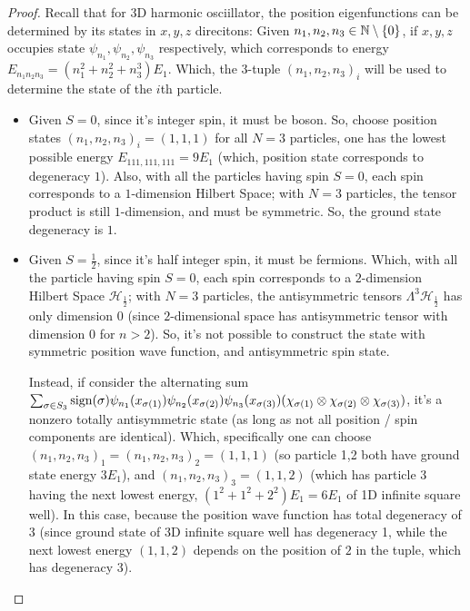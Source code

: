 \documentclass{article}
\begin{document}
\begin{proof}
    Recall that for 3D harmonic osciillator, the position eigenfunctions can be determined by its states in $x,y,z$ direcitons: Given $n_1,n_2,n_3\in\mathbb{N}\setminus\{0\}$, if $x,y,z$ occupies state $\psi_{n_1},\psi_{n_2},\psi_{n_3}$ respectively, which corresponds to energy $E_{n_1n_2n_3}=(n_1^2+n_2^2+n_3^3)E_1$. Which, the 3-tuple $(n_1,n_2,n_3)_i$ will be used to determine the state of the $i$th particle.

    \hfil

    \begin{itemize}
        \item[(a)] Given $S=0$, since it's integer spin, it must be boson. So, choose position states $(n_1,n_2,n_3)_i = (1,1,1)$ for all $N=3$ particles, one has the lowest possible energy $E_{111,111,111} = 9E_1$ (which, position state corresponds to degeneracy $1$). Also, with all the particles having spin $S=0$, each spin corresponds to a $1$-dimension Hilbert Space; with $N=3$ particles, the tensor product is still $1$-dimension, and must be symmetric. So, the ground state degeneracy is $1$.
        
        \hfil

        \item[(b)] Given $S=\frac{1}{2}$, since it's half integer spin, it must be fermions. Which, with all the particle having spin $S=0$, each spin corresponds to a $2$-dimension Hilbert Space $\mathcal{H}_\frac{1}{2}$; with $N=3$ particles, the antisymmetric tensors $\Lambda^3 \mathcal{H}_\frac{1}{2}$ has only dimension $0$ (since $2$-dimensional space has antisymmetric tensor with dimension $0$ for $n>2$). So, it's not possible to construct the state with symmetric position wave function, and antisymmetric spin state. 
        
        Instead, if consider the alternating sum $\sum_{\sigma \in S_3}\mathrm{sign}(\sigma) \psi_{n_1}(x_{\sigma(1)})\psi_{n_2}(x_{\sigma(2)})\psi_{n_3}(x_{\sigma(3)})(\chi_{\sigma(1)}\otimes \chi_{\sigma(2)}\otimes \chi_{\sigma(3)})$, it's a nonzero totally antisymmetric state (as long as not all position / spin components are identical). Which, specifically one can choose $(n_1,n_2,n_3)_1 = (n_1,n_2,n_3)_2 = (1,1,1)$ (so particle 1,2 both have ground state energy $3 E_1$), and $(n_1,n_2,n_3)_3= (1,1,2)$ (which has particle 3 having the next lowest energy, $(1^2+1^2+2^2)E_1 = 6E_1$ of 1D infinite square well). In this case, because the position wave function has total degeneracy of 3 (since ground state of 3D infinite square well has degeneracy 1, while the next lowest energy $(1,1,2)$ depends on the position of $2$ in the tuple, which has degeneracy 3).


\end{itemize}
\end{proof}
\end{document}
